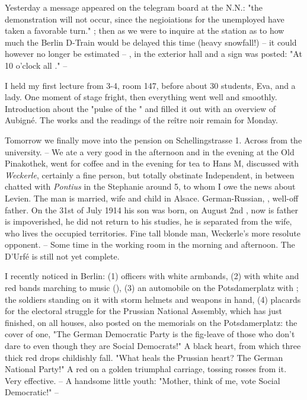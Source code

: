 
Yesterday a message appeared on the telegram board at the N.N.: "the demonstration will not occur, since the negioiations for the unemployed have taken a favorable turn." ; then as we were to inquire at the station as to how much the Berlin D-Train would be delayed this time (heavy snowfall!) -- it could however no longer be estimated -- , in the exterior hall  and a sign was posted: "At 10 o'clock all ." --


I held my first lecture from 3-4, room 147, before about 30 students, Eva, and a lady. One moment of stage fright, then everything went well and smoothly. Introduction about the "pulse of the " and filled it out with an overview of Aubigné. The works and the readings of the reître noir remain for Monday.

Tomorrow we finally move into the pension on Schellingstrasse 1. Across from the university. \missing -- We ate a very good in the afternoon and in the evening at the Old Pinakothek, went for coffee and in the evening for tea to Hans M, discussed with \textit{Weckerle}, certainly a fine person, but totally obstinate Independent, in between chatted with \textit{Pontius} in the Stephanie around 5, to whom I owe the news about Levien. The man is married, wife and child in Alsace. German-Russian, , well-off father. On the 31st of July 1914 his son was born, on August 2nd , now is father is impoverished, he did not return to his studies, he is separated from the wife, who lives the occupied territories. Fine tall blonde man, Weckerle's more resolute opponent. -- Some time in the working room in the morning and afternoon. The D'Urfé is still not yet complete.

I recently noticed in Berlin: (1) officers with white armbands, (2)  with white and red bands marching to music (), (3) an automobile on the Potsdamerplatz with ; the soldiers standing on it with storm helmets and weapons in hand, (4) placards for the electoral struggle for the Prussian National Assembly, which has just finished, on all houses, also posted on the memorials on the Potsdamerplatz: the cover of one, "The German Democratic Party is the fig-leave of those who don't dare to  even though they are Social Democrats!" A black heart, from which three thick red drops childishly fall. "What heals the Prussian heart? The German National Party!" A red  on a golden triumphal carriage, tossing rosses from it. Very effective. -- A handsome little youth: "Mother, think of me, vote Social Democratic!" --

